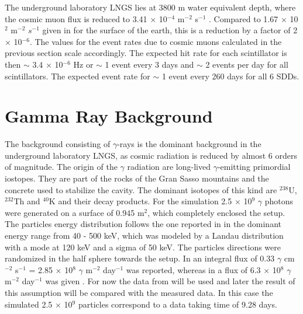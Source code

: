 The underground laboratory LNGS lies at 3800 m water equivalent depth, where the cosmic muon flux is reduced to 3.41 $\times$ 10$^{-4}$ m$^{-2}$ s$^{-1}$ \cite{Bellini2013}. Compared to 1.67 $\times$ 10$^{2}$ m$^{-2}$ $s^{-1}$ given in \cite{Gaisser2000} for the surface of the earth, this is a reduction by a factor of 2 $\times$ 10$^{-6}$. The values for the event rates due to cosmic muons calculated in the previous section scale accordingly. The expected hit rate for each scintillator is then $\sim$ 3.4 $\times$ 10$^{-6}$ Hz or $\sim$ 1 event every 3 days and $\sim$ 2 events per day for all scintillators. The expected event rate for $\sim$ 1 event every 260 days for all 6 SDDs.


\section{Gamma Ray Background}
\label{sec:gammaSim}

  The background consisting of $\gamma$-rays  is the dominant background in the underground laboratory LNGS, as cosmic radiation is reduced by almost 6 orders of magnitude. The origin of the $\gamma$ radiation are long-lived $\gamma$-emitting primordial iostopes. They are part of the rocks of the Gran Sasso mountains and the concrete used to stabilize the cavity. The dominant isotopes of this kind are $^{238}$U, $^{232}$Th and $^{40}$K \cite{Haffke2011} and their decay products. For the simulation 2.5 $\times$ 10$^{9}$ $\gamma$ photons were generated on a surface of 0.945 m$^{2}$, which completely enclosed the setup. The particles energy distribution follows the one reported in \cite{Haffke2011} in the dominant energy range from 40 - 500 keV, which was modeled by a Landau distribution with a mode at 120 keV and a sigma of 50 keV. The particles directions were randomized in the half sphere towards the setup. In \cite{Haffke2011} an integral flux of 0.33 $\gamma$ cm$^{-2}$ s$^{-1}$ = 2.85 $\times$ 10$^{8}$ $\gamma$ m$^{-2}$ day$^{-1}$ was reported, whereas in \cite{Bucci2009} a flux of 6.3 $\times$ 10$^{8}$ $\gamma$ m$^{-2}$ day$^{-1}$ was given . For now the data from \cite{Haffke2011} will be used and later the result of this assumption will be compared with the measured data. In this case the simulated 2.5 $\times$ 10$^{9}$ particles correspond to a data taking time of 9.28 days.

